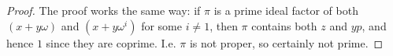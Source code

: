 \begin{proof}
    The proof works the same way: if $\pi$ is a prime ideal factor of both $(x+y\omega)$ and $(x+y\omega^i)$ for some $i \neq 1$, then $\pi$ contains both $z$ and $yp$, and hence $1$ since they are coprime. I.e. $\pi$ is not proper, so certainly not prime.
\end{proof}